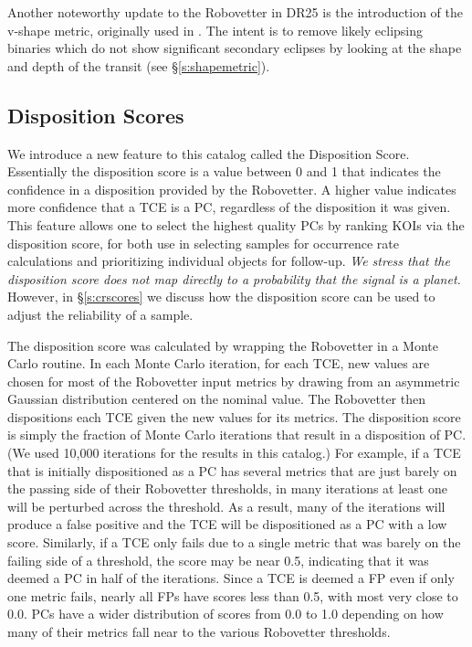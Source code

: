 Another noteworthy update to the Robovetter in DR25 is the introduction of the v-shape metric, originally used in \citet{Batalha2013}.  The intent is to remove likely eclipsing binaries which do not show significant secondary eclipses by looking at the shape and depth of the transit (see \S\ref{s:shapemetric}).




\subsection{Disposition Scores}
\label{s:scores}
We introduce a new feature to this catalog called the Disposition Score. Essentially the disposition score is a value between 0 and 1 that indicates the confidence in a disposition provided by the Robovetter. A higher value indicates more confidence that a TCE is a PC, regardless of the disposition it was given. This feature allows one to select the highest quality PCs by ranking KOIs via the disposition score, for both use in selecting samples for occurrence rate calculations and prioritizing individual objects for follow-up. \emph{We stress that the disposition score does not map directly to a probability that the signal is a planet.} However, in \S\ref{s:crscores} we discuss how the disposition score can be used to adjust the reliability of a sample.

The disposition score was calculated by wrapping the Robovetter in a Monte Carlo routine. In each Monte Carlo iteration, for each TCE, new values are chosen for most of the Robovetter input metrics by drawing from an asymmetric Gaussian distribution centered on the nominal value. The Robovetter then dispositions each TCE given the new values for its metrics. The disposition score is simply the fraction of Monte Carlo iterations that result in a disposition of PC. (We used 10,000 iterations for the results in this catalog.) For example, if a TCE that is initially dispositioned as a PC has several metrics that are just barely on the passing side of their Robovetter thresholds, in many iterations at least one will be perturbed across the threshold. As a result, many of the iterations will produce a false positive and the TCE will be dispositioned as a PC with a low score.  Similarly, if a TCE only fails due to a single metric that was barely on the failing side of a threshold, the score may be near 0.5, indicating that it was deemed a PC in half of the iterations.  Since a TCE is deemed a FP even if only one metric fails, nearly all FPs have scores less than 0.5, with most very close to 0.0.  PCs have a wider distribution of scores from 0.0 to 1.0 depending on how many of their metrics fall near to the various Robovetter thresholds.

